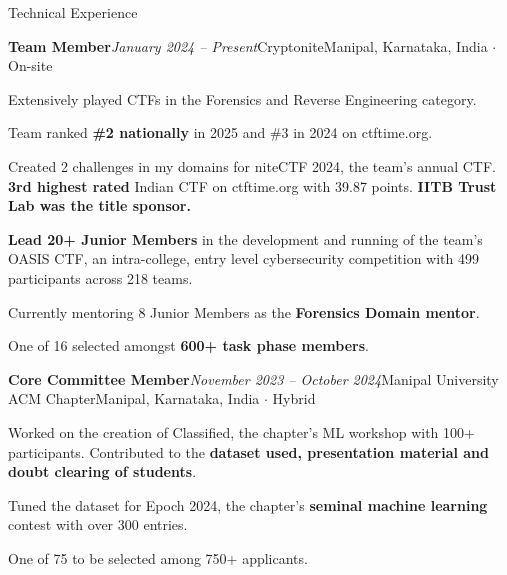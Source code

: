 \documentclass{resume} %
\begin{document}
\begin{rSection}{Technical Experience}
\begin{rSubsection}{\bf Team Member}{\em January 2024 -- Present}{Cryptonite}{Manipal, Karnataka, India $\cdot$ On-site}
\item Extensively played CTFs in the Forensics and Reverse Engineering category.
\item Team ranked \textbf{\#2 nationally} in 2025 and \#3 in 2024 on ctftime.org.
\item Created 2 challenges in my domains for niteCTF 2024, the team's annual CTF. \textbf{3rd highest rated} Indian CTF on ctftime.org with 39.87 points. \textbf{IITB Trust Lab was the title sponsor.}
\item \textbf{Lead 20+ Junior Members} in the development and running of the team's OASIS CTF, an intra-college, entry level cybersecurity competition with 499 participants across 218 teams.
\item Currently mentoring 8 Junior Members as the \textbf{Forensics Domain mentor}.
\item One of 16 selected amongst \textbf{600+ task phase members}.
\end{rSubsection}
\begin{rSubsection}{\bf Core Committee Member}{\em November 2023 -- October 2024}{Manipal University ACM Chapter}{Manipal, Karnataka, India $\cdot$ Hybrid}
\item Worked on the creation of Classified, the chapter's ML workshop with 100+ participants. Contributed to the \textbf{dataset used, presentation material and doubt clearing of students}.
\item Tuned the dataset for Epoch 2024, the chapter's \textbf{seminal machine learning} contest with over 300 entries.
\item One of 75 to be selected among 750+ applicants.
\end{rSubsection}

\end{rSection}
\end{document}
